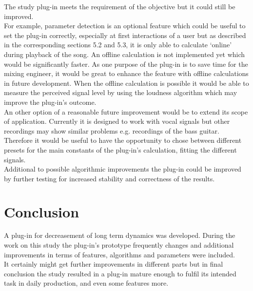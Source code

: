 The study plug-in meets the requirement of the objective but it could still be improved.\\
For example, parameter detection is an optional feature which could be useful to set the plug-in correctly, especially at first interactions of a user but as described in the corresponding sections 5.2 and 5.3, it is only able to calculate ‘online’ during playback of the song. An offline calculation is not implemented yet which would be significantly faster. As one purpose of the plug-in is to save time for the mixing engineer, it would be great to enhance the feature with offline calculations in future development. When the offline calculation is possible it would be able to measure the perceived signal level by using the loudness algorithm\cite{ITUalgo} which may improve the plug-in’s outcome.\\
An other option of a reasonable future improvement would be to extend its scope of application. Currently it is designed to work with vocal signals but other recordings may show similar problems e.g. recordings of the bass guitar. Therefore it would be useful to have the opportunity to chose between different presets for the main constants of the plug-in’s calculation, fitting the different signals.\\
Additional to possible algorithmic improvements the plug-in could be improved by further testing for increased stability and correctness of the results.\\

\section{Conclusion}

A plug-in for decreasement of long term dynamics was developed. During the work on this study the plug-in’s prototype frequently changes and additional improvements in terms of features, algorithms and parameters were included.\\
It certainly might get further improvements in different parts but in final conclusion the study resulted in a plug-in mature enough to fulfil its intended task in daily production, and even some features more.\\



